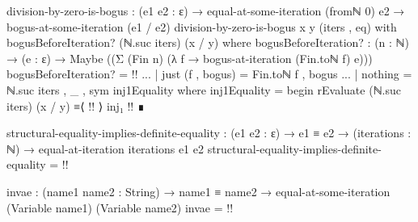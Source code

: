 \documentclass{report}
\begin{document}
\begin{code}
  division-by-zero-is-bogus :
    (e1 e2 : ε) →
    equal-at-some-iteration (fromℕ 0) e2 →
    bogus-at-some-iteration (e1 / e2)
  division-by-zero-is-bogus x y (iters , eq) with bogusBeforeIteration? (ℕ.suc iters) (x / y)
    where
    bogusBeforeIteration? :
      (n : ℕ) →
      (e : ε) →
      Maybe ((Σ (Fin n) (λ f → bogus-at-iteration (Fin.toℕ f) e)))
    bogusBeforeIteration? = {!!}
  ... | just (f , bogus) = Fin.toℕ f , bogus
  ... | nothing = ℕ.suc iters , _ , sym inj1Equality
    where
    inj1Equality = begin
      rEvaluate (ℕ.suc iters) (x / y)
        ≡⟨ {!!} ⟩
      inj₁ {!!} ∎

  structural-equality-implies-definite-equality :
    (e1 e2 : ε) →
    e1 ≡ e2 →
    (iterations : ℕ) →
    equal-at-iteration iterations e1 e2
  structural-equality-implies-definite-equality = {!!}

  invae : (name1 name2 : String) →
          name1 ≡ name2 →
          equal-at-some-iteration (Variable name1) (Variable name2)
  invae = {!!}
\end{code}
\end{document}
